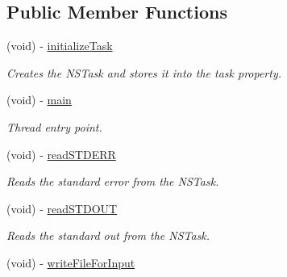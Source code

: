 \subsection*{Public Member Functions}
\begin{DoxyCompactItemize}
\item 
\hypertarget{interface_g_d_base_n_s_task_operation_adb6d8c62141862d38fc552ab774919e4}{
(void) -\/ \hyperlink{interface_g_d_base_n_s_task_operation_adb6d8c62141862d38fc552ab774919e4}{initializeTask}}
\label{interface_g_d_base_n_s_task_operation_adb6d8c62141862d38fc552ab774919e4}

\begin{DoxyCompactList}\small\item\em Creates the NSTask and stores it into the task property. \item\end{DoxyCompactList}\item 
\hypertarget{interface_g_d_base_n_s_task_operation_a362b39899b535294caef074f2908e55c}{
(void) -\/ \hyperlink{interface_g_d_base_n_s_task_operation_a362b39899b535294caef074f2908e55c}{main}}
\label{interface_g_d_base_n_s_task_operation_a362b39899b535294caef074f2908e55c}

\begin{DoxyCompactList}\small\item\em Thread entry point. \item\end{DoxyCompactList}\item 
\hypertarget{interface_g_d_base_n_s_task_operation_a97a8c1fc80d87967f3bb9db1afbcd693}{
(void) -\/ \hyperlink{interface_g_d_base_n_s_task_operation_a97a8c1fc80d87967f3bb9db1afbcd693}{readSTDERR}}
\label{interface_g_d_base_n_s_task_operation_a97a8c1fc80d87967f3bb9db1afbcd693}

\begin{DoxyCompactList}\small\item\em Reads the standard error from the NSTask. \item\end{DoxyCompactList}\item 
\hypertarget{interface_g_d_base_n_s_task_operation_adc0ff21c37dfe2fad5d1ca283e912fe3}{
(void) -\/ \hyperlink{interface_g_d_base_n_s_task_operation_adc0ff21c37dfe2fad5d1ca283e912fe3}{readSTDOUT}}
\label{interface_g_d_base_n_s_task_operation_adc0ff21c37dfe2fad5d1ca283e912fe3}

\begin{DoxyCompactList}\small\item\em Reads the standard out from the NSTask. \item\end{DoxyCompactList}\item 
\hypertarget{interface_g_d_base_n_s_task_operation_a244ac6e14accbefe686206c5d5656dab}{
(void) -\/ \hyperlink{interface_g_d_base_n_s_task_operation_a244ac6e14accbefe686206c5d5656dab}{writeFileForInput}}
\label{interface_g_d_base_n_s_task_operation_a244ac6e14accbefe686206c5d5656dab}


\end{DoxyCompactItemize}
